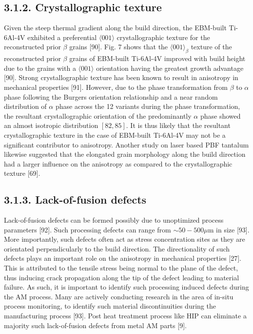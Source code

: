 \documentclass[10pt]{article}
\begin{document}
\subsection*{3.1.2. Crystallographic texture}
Given the steep thermal gradient along the build direction, the EBM-built Ti-6Al-4V exhibited a preferential $\langle 001\rangle$ crystallographic texture for the reconstructed prior $\beta$ grains [90]. Fig. 7 shows that the $\langle 001\rangle_{\beta}$ texture of the reconstructed prior $\beta$ grains of EBM-built Ti-6Al-4V improved with build height due to the grains with a $\langle 001\rangle$ orientation having the greatest growth advantage [90]. Strong crystallographic texture has been known to result in anisotropy in mechanical properties [91]. However, due to the phase transformation from $\beta$ to $\alpha$ phase following the Burgers orientation relationship and a near random distribution of $\alpha$ phase across the 12 variants during the phase transformation, the resultant crystallographic orientation of the predominantly $\alpha$ phase showed an almost isotropic distribution $[82,85]$. It is thus likely that the resultant crystallographic texture in the case of EBM-built Ti-6Al-4V may not be a significant contributor to anisotropy. Another study on laser based PBF tantalum likewise suggested that the elongated grain morphology along the build direction had a larger influence on the anisotropy as compared to the crystallographic texture [69].

\subsection*{3.1.3. Lack-of-fusion defects}
Lack-of-fusion defects can be formed possibly due to unoptimized process parameters [92]. Such processing defects can range from $\sim 50-500 \mu \mathrm{m}$ in size [93]. More importantly, such defects often act as stress concentration sites as they are orientated perpendicularly to the build direction. The directionality of such defects plays an important role on the anisotropy in mechanical properties [27]. This is attributed to the tensile stress being normal to the plane of the defect, thus inducing crack propagation along the tip of the defect leading to material failure. As such, it is important to identify such processing induced defects during the AM process. Many are actively conducting research in the area of in-situ process monitoring, to identify such material discontinuities during the manufacturing process [93]. Post heat treatment process like HIP can eliminate a majority such lack-of-fusion defects from metal AM parts [9].
\end{document}
